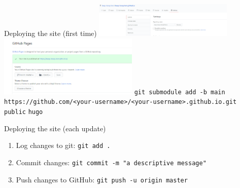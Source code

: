 \documentclass{beamer}
\begin{document}
\begin{frame}{Deploying the site (first time)}
	\centering
	\includegraphics[width=0.5\textwidth]{figs/settings.png}
	\bigbreak
	\includegraphics[width=0.5\textwidth]{figs/activate-ghp.png}
	\bigbreak
	\texttt{git submodule add -b main https://github.com/<your-username>/<your-username>.github.io.git public}
	\bigbreak
	\texttt{hugo}
\end{frame}

\begin{frame}{Deploying the site (each update)}
	\begin{enumerate}
		\item Log changes to git: \texttt{git add .} \pause
		\item Commit changes: \texttt{git commit -m "a descriptive message"} \pause
		\item Push changes to GitHub: \texttt{git push -u origin master}
	\end{enumerate}
\end{frame}
\end{document}
